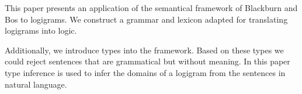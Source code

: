 This paper presents an application of the semantical framework of Blackburn and Bos to logigrams. We construct a grammar and lexicon adapted for translating logigrams into logic.

Additionally, we introduce types into the framework. Based on these types we could reject sentences that are grammatical but without meaning. In this paper type inference is used to infer the domains of a logigram from the sentences in natural language.


